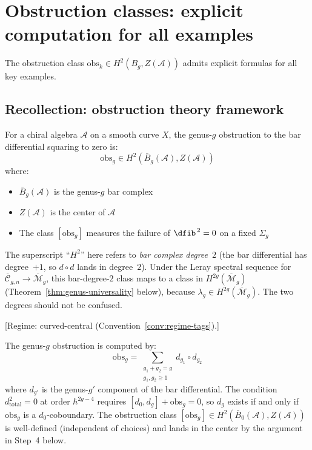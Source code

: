 \section{Obstruction classes: explicit computation for all examples}
\label{sec:obstruction-explicit}

The obstruction class $\text{obs}_k \in H^2(B_g, Z(\mathcal{A}))$ admits explicit formulas for all key examples.

\subsection{Recollection: obstruction theory framework}
\label{subsec:obstruction-framework-recall}

\begin{definition}\label{def:genus-g-obstruction}
For a chiral algebra $\mathcal{A}$ on a smooth curve $X$, the genus-$g$
obstruction to the bar differential squaring to zero is:
\[\text{obs}_g \in H^2(\bar{B}_g(\mathcal{A}), Z(\mathcal{A}))\]
where:
\begin{itemize}
\item $\bar{B}_g(\mathcal{A})$ is the genus-$g$ bar complex
\item $Z(\mathcal{A})$ is the center of $\mathcal{A}$
\item The class $[\text{obs}_g]$ measures the failure of $\dfib^{\,2} = 0$ on a fixed $\Sigma_g$
\end{itemize}
The superscript ``$H^2$'' here refers to \emph{bar complex degree}~$2$ (the bar differential has degree~$+1$, so $d \circ d$ lands in degree~$2$).  Under the Leray spectral sequence for $\overline{\mathcal{C}}_{g,n} \to \overline{\mathcal{M}}_g$, this bar-degree-$2$ class maps to a class in $H^{2g}(\overline{\mathcal{M}}_g)$ (Theorem~\ref{thm:genus-universality} below), because $\lambda_g \in H^{2g}(\overline{\mathcal{M}}_g)$.  The two degrees should not be confused.
\end{definition}

\begin{theorem}\label{thm:obstruction-general}
\textup{[Regime: curved-central
\textup{(}Convention~\textup{\ref{conv:regime-tags})}.]}

The genus-$g$ obstruction is computed by:
\begin{equation}
\mathrm{obs}_g = \sum_{\substack{g_1+g_2=g \\ g_1, g_2 \geq 1}} d_{g_1} \circ d_{g_2}
\end{equation}
where $d_{g'}$ is the genus-$g'$ component of the bar differential.  The condition $d_{\mathrm{total}}^2 = 0$ at order $\hbar^{2g-4}$ requires $[d_0, d_g] + \mathrm{obs}_g = 0$, so $d_g$ exists if and only if $\mathrm{obs}_g$ is a $d_0$-coboundary. The obstruction class $[\mathrm{obs}_g] \in H^2(\bar{B}_0(\mathcal{A}), Z(\mathcal{A}))$ is well-defined (independent of choices) and lands in the center by the argument in Step~4 below.
\end{theorem}

